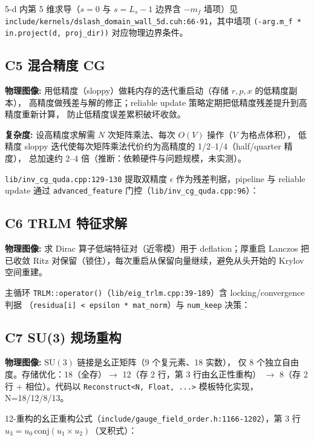 \documentclass[UTF8]{ctexart}
\begin{document}
5-d 内第 5 维求导（$s=0$ 与 $s=L_s-1$ 边界含 $-m_f$ 墙项）见
\texttt{\nolinkurl{include/kernels/dslash_domain_wall_5d.cuh:66-91}}，其中墙项 \texttt{(-arg.m\_f *
in.project(d, proj\_dir))} 对应物理边界条件。

\subsection{C5 混合精度 CG}
\begin{physbox}
\textbf{物理图像:} 用低精度（sloppy）做耗内存的迭代重启动（存储 $r, p, x$ 的低精度副本），
高精度做残差与解的修正；reliable update 策略定期把低精度残差提升到高精度重新计算，
防止低精度误差累积破坏收敛。
\end{physbox}
\begin{algobox}
\textbf{复杂度:} 设高精度求解需 $N$ 次矩阵乘法、每次 $O(V)$ 操作（$V$ 为格点体积），
低精度 sloppy 迭代使每次矩阵乘法代价约为高精度的 1/2--1/4（half/quarter 精度），
总加速约 2--4 倍（推断：依赖硬件与问题规模，未实测）。
\end{algobox}
\texttt{\nolinkurl{lib/inv_cg_quda.cpp:129-130}} 提取双精度 $\epsilon$ 作为残差判据，pipeline 与 reliable
update 通过 \texttt{advanced\_feature} 门控（\texttt{\nolinkurl{lib/inv_cg_quda.cpp:96}}）：


\subsection{C6 TRLM 特征求解}
\begin{physbox}
\textbf{物理图像:} 求 Dirac 算子低端特征对（近零模）用于 deflation；厚重启 Lanczos 把
已收敛 Ritz 对保留（锁住），每次重启从保留向量继续，避免从头开始的 Krylov 空间重建。
\end{physbox}
主循环 \texttt{TRLM::operator()}（\texttt{\nolinkurl{lib/eig_trlm.cpp:39-189}}）含 locking/convergence 判据
（\texttt{residua[i] < epsilon * mat\_norm}）与 \texttt{num\_keep} 决策：


\subsection{C7 SU(3) 规场重构}
\begin{physbox}
\textbf{物理图像:} $\mathrm{SU}(3)$ 链接是幺正矩阵（9 个复元素、18 实数），
仅 8 个独立自由度。存储优化：18（全存）$\to$ 12（存 2 行，第 3 行由幺正性重构）
$\to$ 8（存 2 行 + 相位）。代码以 \texttt{Reconstruct<N, Float, ...>} 模板特化实现，
N=18/12/8/13。
\end{physbox}
12-重构的幺正重构公式（\texttt{\nolinkurl{include/gauge_field_order.h:1166-1202}}），第 3 行
$u_3 = u_0 \, \mathrm{conj}(u_1\times u_2)$（叉积式）：

\end{document}
